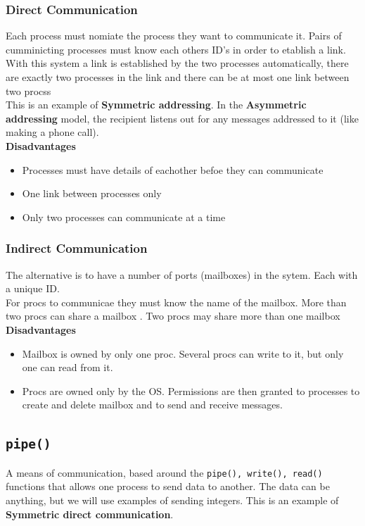 \documentclass[a4paper, 10pt]{article}
\begin{document}
\pagebreak
\subsubsection{Direct Communication}
Each process must nomiate the process they want to communicate it. Pairs of cumminicting processes must know each others ID's in order to etablish a link. With this system a link is established by the two processes automatically, there are exactly two processes in the link and there can be at most one link between two procss\\[2ex]
This is an example of \textbf{Symmetric addressing}. In the \textbf{Asymmetric addressing} model, the recipient listens out for any messages addressed to it (like making a phone call).\\[2ex]
\textbf{Disadvantages}
\begin{itemize}
    \item Processes must have details of eachother befoe they can communicate
    \item One link between processes only
    \item Only two processes can communicate at a time
\end{itemize}
\subsubsection{Indirect Communication}
The alternative is to have a number of ports (mailboxes) in the sytem. Each with a unique ID. \\[2ex]
For procs to communicae they must know the name of the mailbox. More than two procs can share a mailbox . Two procs may share more than one mailbox \\[2ex]
\textbf{Disadvantages}
\begin{itemize}
    \item Mailbox is owned by only one proc. Several procs can write to it, but only one can read from it.
    \item Procs are owned only by the OS. Permissions are then granted to processes to create and delete mailbox and to send and receive messages.
\end{itemize}
\subsection{\texttt{pipe()}}
A means of communication, based around the \texttt{pipe(), write(), read()} functions that allows one process to send data to another. The data can be anything, but we will use examples of sending integers. This is an example of \textbf{Symmetric direct communication}.
\end{document}
